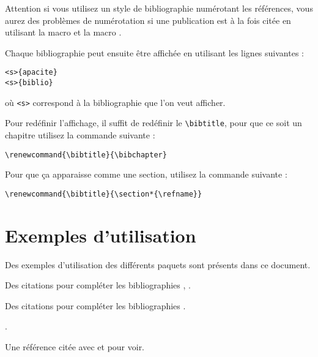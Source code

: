 Attention si vous utilisez un style de bibliographie numérotant les références, vous aurez des problèmes de numérotation si une publication est à la fois citée en utilisant la macro  et la macro .



Chaque bibliographie peut ensuite être affichée en utilisant les lignes suivantes :

\begin{framed}\vspace{-0.75em}
\begin{verbatim}<s>{apacite}
<s>{biblio}
\end{verbatim}\vspace{-0.75em}
\end{framed}

où \verb|<s>| correspond à la bibliographie que l'on veut afficher.

Pour redéfinir l'affichage, il suffit de redéfinir le \verb|\bibtitle|, pour que ce soit un chapitre utilisez la commande suivante :

\begin{framed}\vspace{-0.75em}
\begin{verbatim}\renewcommand{\bibtitle}{\bibchapter}
\end{verbatim}\vspace{-0.75em}
\end{framed}

Pour que ça apparaisse comme une section, utilisez la commande suivante :

\begin{framed}\vspace{-0.75em}
\begin{verbatim}\renewcommand{\bibtitle}{\section*{\refname}}
\end{verbatim}\vspace{-0.75em}
\end{framed}


\section{Exemples d'utilisation}

Des exemples d'utilisation des différents paquets sont présents dans ce document.


Des citations pour compléter les bibliographies , .


Des citations pour compléter les bibliographies .

.

Une référence citée avec   et  \cite{DHHS2011} pour voir.


\renewcommand{\bibtitle}{\section*{\refname}}
